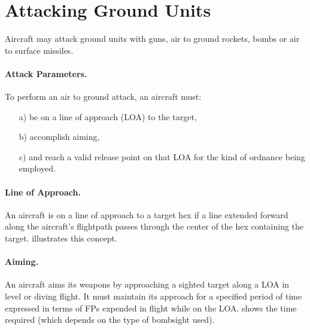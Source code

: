 \section{Attacking Ground Units}

Aircraft may attack ground units with guns, air to ground rockets, bombs or air to surface missiles.

\paragraph{Attack Parameters.}
To perform an air to ground attack, an aircraft must:
\begin{enumerate}
    \item[a)] be on a line of approach (LOA) to the target,
    \item[b)] accomplish aiming,
    \item[c)] and reach a valid release point on that LOA for the kind of ordnance being employed.
\end{enumerate}

\paragraph{Line of Approach.} An aircraft is on a line of approach to a target hex if a line extended forward along the aircraft's flightpath passes through the center of the hex containing the target.  illustrates this concept. 



\paragraph{Aiming.} An aircraft aims its weapons by approaching a sighted target along a LOA in level or diving flight. It must maintain its approach for a specified period of time expressed in terms of FPs expended in flight while on the LOA.  shows the time required (which depends on the type of bombsight used). 


